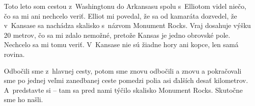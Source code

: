 







Toto leto som cestou z~Washingtonu do Arkansasu spolu s~Elliotom videl niečo, čo sa mi ani nechcelo veriť. Elliot mi povedal, že sa od kamaráta dozvedel, že v~Kansase sa nachádza skalisko s~názvom Monument Rocks. Vraj dosahuje výšku 20 metrov, čo sa mi zdalo nemožné, pretože Kansas je jedno obrovské pole. Nechcelo sa mi tomu veriť. V~Kansase nie sú žiadne hory ani kopce, len samá rovina.

Odbočili sme z~hlavnej cesty, potom sme znovu odbočili a znovu a pokračovali sme po jednej veľmi zanedbanej ceste pomedzi polia asi ďalších desať kilometrov. A~predstavte si -- tam sa pred nami týčilo skalisko Monument Rocks. Skutočne sme ho našli.

